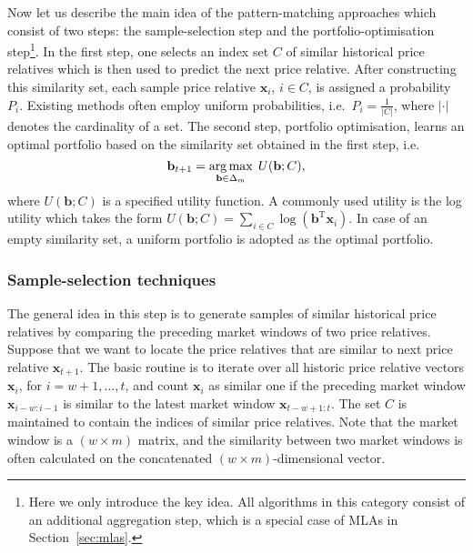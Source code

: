 Now let us describe the main idea of the pattern-matching approaches \citep{bnn} which consist of two steps: the sample-selection step and the portfolio-optimisation step\footnote{Here we only introduce the key idea. All algorithms in this category consist of an additional aggregation step, which is a special case of MLAs in Section~\ref{sec:mlas}.}. In the first step, one selects an index set $C$ of similar historical price relatives which is then used to predict the next price relative. After constructing this similarity set, each sample price relative $\mathbf{x}_i$, $i \in C$, is assigned a probability $P_i$. Existing methods often employ uniform probabilities, i.e.\ $P_i = \frac{1}{|C|}$, where $|\cdot|$ denotes the cardinality of a set. The second step, portfolio optimisation, learns an optimal portfolio based on the similarity set obtained in the first step, i.e.\
\begin{equation}
	\mathbf{b}_{t+1} = \operatorname*{arg\,max}_{\mathbf{b}\in\Delta_m} \; U(\mathbf{b}; C),
\end{equation}
where $U(\mathbf{b}; C)$ is a specified utility function. A commonly used utility is the log utility which takes the form $U(\mathbf{b}; C) = \sum_{i \in C}\log(\mathbf{b}^\text{T}\mathbf{x}_i)$. In case of an empty similarity set, a uniform portfolio is adopted as the optimal portfolio.

\subsubsection{Sample-selection techniques}

The general idea in this step is to generate samples of similar historical price relatives by comparing the preceding market windows of two price relatives. Suppose that we want to locate the price relatives that are similar to next price relative $\mathbf{x}_{t+1}$. The basic routine is to iterate over all historic price relative vectors $\mathbf{x}_i$, for $i = w + 1, \ldots, t$, and count $\mathbf{x}_i$ as similar one if the preceding market window $\mathbf{x}_{i-w:i-1}$ is similar to the latest market window $\mathbf{x}_{t-w+1:t}$. The set $C$ is maintained to contain the indices of similar price relatives. Note that the market window is a $(w \times m)$ matrix, and the similarity between two market windows is often calculated on the concatenated $(w \times m)$-dimensional vector.

